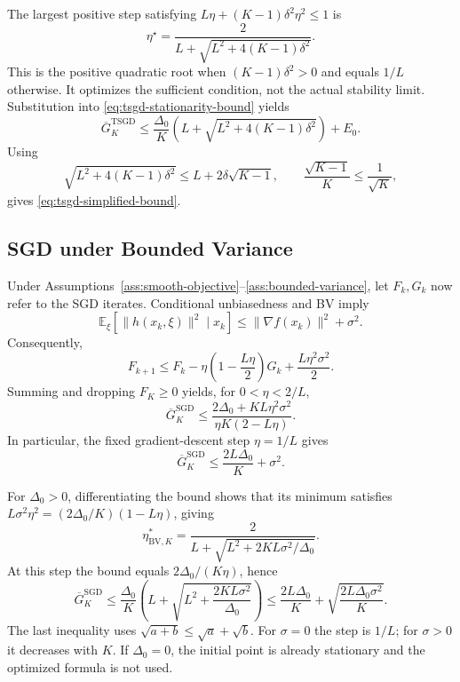 The largest positive step satisfying
$L\eta+(K-1)\delta^2\eta^2\leq1$ is
\begin{equation}
\label{eq:tsgd-optimal-step}
\boxed{\eta^\star
 =\frac{2}{L+\sqrt{L^2+4(K-1)\delta^2}}.}
\end{equation}
This is the positive quadratic root when $(K-1)\delta^2>0$
and equals $1/L$ otherwise. It optimizes the sufficient condition,
not the actual stability limit.
Substitution into \eqref{eq:tsgd-stationarity-bound} yields
\begin{equation}
\label{eq:tsgd-optimized-bound}
\overline G_K^{\mathrm{TSGD}}
\leq\frac{\Delta_0}{K}
   \left(L+\sqrt{L^2+4(K-1)\delta^2}\right)+E_0.
\end{equation}
Using
\[
\sqrt{L^2+4(K-1)\delta^2}\leq L+2\delta\sqrt{K-1},
\qquad \frac{\sqrt{K-1}}K\leq\frac1{\sqrt K},
\]
gives \eqref{eq:tsgd-simplified-bound}.
\subsection{SGD under Bounded Variance}
\label{app:sgd-convergence}

Under Assumptions~\ref{ass:smooth-objective}--\ref{ass:bounded-variance},
let $F_k,G_k$ now refer to the SGD iterates. Conditional unbiasedness
and BV imply
\[
\mathbb E_\xi[\|h(x_k,\xi)\|^2\mid x_k]
\leq\|\nabla f(x_k)\|^2+\sigma^2.
\]
Consequently,
\[
F_{k+1}\leq F_k-\eta\left(1-\frac{L\eta}{2}\right)G_k
                    +\frac{L\eta^2\sigma^2}{2}.
\]
Summing and dropping $F_K\geq0$ yields, for $0<\eta<2/L$,
\begin{equation}
\label{eq:sgd-bv-bound}
\boxed{\overline G_K^{\mathrm{SGD}}
\leq\frac{2\Delta_0+KL\eta^2\sigma^2}{\eta K(2-L\eta)}.}
\end{equation}
In particular, the fixed gradient-descent step $\eta=1/L$ gives
\begin{equation}
\label{eq:sgd-bv-fixed-step}
\overline G_K^{\mathrm{SGD}}
\leq\frac{2L\Delta_0}{K}+\sigma^2.
\end{equation}

For $\Delta_0>0$, differentiating the bound shows that its minimum
satisfies $L\sigma^2\eta^2=(2\Delta_0/K)(1-L\eta)$, giving
\begin{equation}
\label{eq:sgd-bv-optimal-step}
\boxed{\eta_{\mathrm{BV},K}^*
 =\frac{2}{L+\sqrt{L^2+2KL\sigma^2/\Delta_0}}.}
\end{equation}
At this step the bound equals $2\Delta_0/(K\eta)$, hence
\begin{equation}
\label{eq:sgd-bv-optimized-bound}
\boxed{\overline G_K^{\mathrm{SGD}}
\leq\frac{\Delta_0}{K}
 \left(L+\sqrt{L^2+\frac{2KL\sigma^2}{\Delta_0}}\right)
\leq\frac{2L\Delta_0}{K}
     +\sqrt{\frac{2L\Delta_0\sigma^2}{K}}.}
\end{equation}
The last inequality uses $\sqrt{a+b}\leq\sqrt a+\sqrt b$.
For $\sigma=0$ the step is $1/L$; for $\sigma>0$ it decreases
with $K$. If $\Delta_0=0$, the initial point is already stationary
and the optimized formula is not used.

